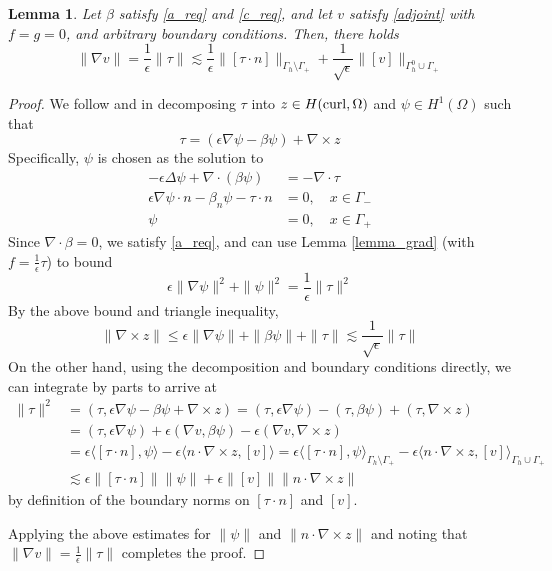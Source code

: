 \documentclass[11pt,onecolumn]{scrartcl}
\newcommand{\grad}{\nabla}
\newcommand{\curl}{\grad \times}
\renewcommand{\div}{\grad \cdot}
\newtheorem{lemma}{Lemma}
\begin{document}
\begin{lemma}
\label{lemma_boundary}
Let $\beta$ satisfy \eqref{a_req} and \eqref{c_req}, and let $v$ satisfy \eqref{adjoint} with $f=g=0$, and arbitrary boundary conditions.  Then, there holds
\[
\|\grad v\| = \frac{1}{\epsilon}\|\tau\| \lesssim \frac{1}{\epsilon} \| [\tau\cdot n]\|_{\Gamma_h \setminus \Gamma_+} + \frac{1}{\sqrt{\epsilon}} \| [v]\|_{\Gamma_h^0 \cup \Gamma_+}
\]
\end{lemma}
\begin{proof}
We follow \cite{analysisDPG} and \cite{DPGrobustness} in decomposing $\tau$ into $z\in H({\rm curl},\Omega)$ and $\psi\in H^1(\Omega)$ such that
\[
\tau = \left(\epsilon \grad \psi - \beta \psi\right) + \curl z
\]
Specifically, $\psi$ is chosen as the solution to 
\begin{align*}
-\epsilon \Delta \psi + \div \left(\beta \psi\right) &= -\div \tau \\
\epsilon \grad \psi \cdot n - \beta_n \psi - \tau\cdot n &= 0, \quad x\in \Gamma_-\\
\psi &= 0, \quad x\in \Gamma_+ 
\end{align*}
Since $\div \beta = 0$, we satisfy \eqref{a_req}, and can use Lemma \ref{lemma_grad} (with $f = \frac{1}{\epsilon}\tau$) to bound
\[
\epsilon \|\grad \psi\|^2 + \|\psi \|^2 = \frac{1}{\epsilon}\|\tau\|^2
\]
By the above bound and triangle inequality, 
\[
\|\curl z \| \leq \epsilon \|\grad \psi\| + \|\beta \psi\| + \|\tau\| \lesssim \frac{1}{\sqrt{\epsilon}}\|\tau\|
\]
On the other hand, using the decomposition and boundary conditions directly, we can integrate by parts to arrive at
\begin{align*}
\|\tau\|^2 &= (\tau, \epsilon \grad \psi - \beta \psi + \curl z) = (\tau, \epsilon \grad \psi) - (\tau,\beta \psi) + (\tau,\curl z)  \\
&=(\tau, \epsilon \grad \psi) + \epsilon(\grad v,\beta \psi) - \epsilon(\grad v,\curl z)  \\
&=\epsilon \langle [\tau \cdot n],\psi \rangle - \epsilon  \langle n\cdot \curl z, [v]\rangle = \epsilon \langle [\tau \cdot n],\psi \rangle_{\Gamma_h \setminus \Gamma_+} - \epsilon  \langle n\cdot \curl z, [v]\rangle_{\Gamma_h \cup \Gamma_+}\\
&\lesssim \epsilon \|[\tau \cdot n]\| \|\psi\| + \epsilon \| [v]\|\| n\cdot \curl z \| 
\end{align*}
by definition of the boundary norms on $[\tau\cdot n]$ and $[v]$.  

Applying the above estimates for $\|\psi\|$ and $\|n\cdot \curl z\|$ and noting that $\|\grad v\| = \frac{1}{\epsilon}\|\tau\|$ completes the proof.
\end{proof}
\end{document}
